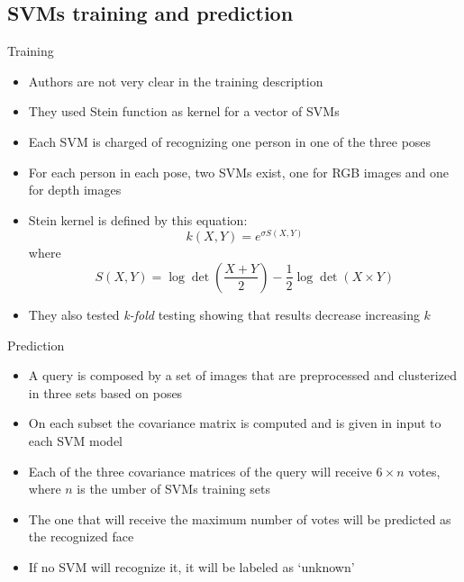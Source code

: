 \documentclass[unknownkeysallowed]{beamer}
\begin{document}
\subsection{SVMs training and prediction}
\begin{frame}{Training}
	\begin{itemize}
		\item Authors are not very clear in the training description
		\item They used Stein function as kernel for a vector of SVMs
		\item Each SVM is charged of recognizing one person in one of
			the three poses
		\item For each person in each pose, two SVMs exist, one for RGB
			images and one for depth images
		\item Stein kernel is defined by this equation:
			$$
			k(X, Y) = e^{\sigma S(X,Y)}
			$$
			where
			$$
			S(X, Y) = \log\det\left(\frac{X +
			Y}{2}\right)-\frac{1}{2} \log \det(X\times Y)
			$$
		\item They also tested \textit{k-fold} testing showing that
			results decrease increasing $k$

	\end{itemize}
\end{frame}

\begin{frame}{Prediction}
	\begin{itemize}
		\item A query is composed by a set of images that are
			preprocessed and clusterized in three sets based on
			poses
		\item On each subset the covariance matrix is computed and is
			given in input to each SVM model
		\item Each of the three covariance matrices of the query will
			receive $6 \times n$ votes, where $n$ is the umber of
			SVMs training sets
		\item The one that will receive the maximum number of votes
			will be predicted as the recognized face
		\item If no SVM will recognize it, it will be labeled as
			`unknown'
	\end{itemize}
\end{frame}
\end{document}
